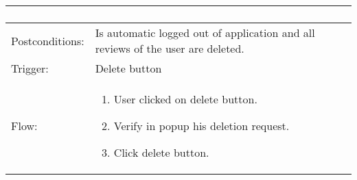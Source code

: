 \begin{longtable}{| p{3.5cm} | p{9cm} |}
\begin{enumerate}
\end{enumerate}\\
\hline
Postconditions: & Is automatic logged out of application and all reviews of the user are deleted.\\
\hline
Trigger: & Delete button \\
\hline
Flow: &\mbox{}\par\vspace{-\baselineskip}
\begin{enumerate}
\item User clicked on delete button.
\item Verify in popup his deletion request.
\item Click delete button.
\end{enumerate}\\
\hline
\end{longtable}

